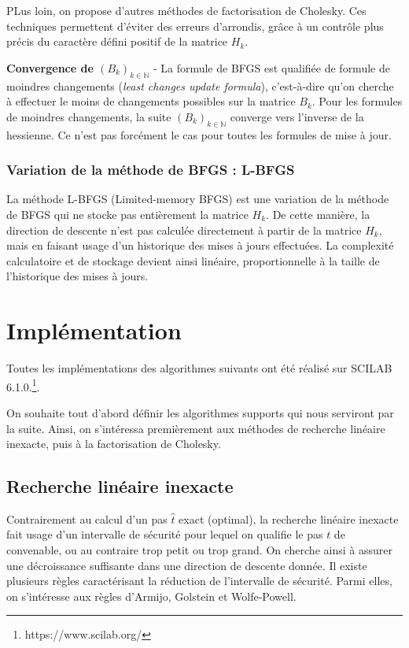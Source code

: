\documentclass[3p, twocolumn]{elsarticle}
\begin{document}
PLus loin, on propose d'autres méthodes de factorisation de Cholesky. Ces techniques permettent d'éviter des erreurs d'arrondis, grâce à un contrôle plus précis du caractère défini positif de la matrice $H_{k}$.

\begin{rmk}
    \textbf{Convergence de $(B_k)_{k\in \mathbb{N}}$} - La formule de BFGS est qualifiée de formule de moindres changements (\textit{least changes update formula}), c'est-à-dire qu'on cherche à effectuer le moins de changements possibles sur la matrice $B_k$. Pour les formules de moindres changements, la suite $(B_k)_{k\in \mathbb{N}}$ converge vers l'inverse de la hessienne. Ce n'est pas forcément le cas pour toutes les formules de mise à jour.
\end{rmk}

\subsubsection{Variation de la méthode de BFGS : L-BFGS}
La méthode L-BFGS (Limited-memory BFGS) est une variation de la méthode de BFGS qui ne stocke pas entièrement la matrice $H_k$. De cette manière, la direction de descente n'est pas calculée directement à partir de la matrice $H_k$, mais en faisant usage d'un historique des mises à jours effectuées. La complexité calculatoire et de stockage devient ainsi linéaire, proportionnelle à la taille de l'historique des mises à jours.

\section{Implémentation}
Toutes les implémentations des algorithmes suivants ont été réalisé sur SCILAB 6.1.0.\footnote{https://www.scilab.org/}.

On souhaite tout d'abord définir les algorithmes supports qui nous serviront par la suite. Ainsi, on s'intéressa premièrement aux méthodes de recherche linéaire inexacte, puis à la factorisation de Cholesky.

\subsection{Recherche linéaire inexacte}
Contrairement au calcul d'un pas $\hat t$ exact (optimal), la recherche linéaire inexacte fait usage d'un intervalle de sécurité pour lequel on qualifie le pas $t$ de convenable, ou au contraire trop petit ou trop grand. On cherche ainsi à assurer une décroissance suffisante dans une direction de descente donnée. Il existe plusieurs règles caractérisant la réduction de l'intervalle de sécurité. Parmi elles, on s'intéresse aux règles d'Armijo, Golstein et Wolfe-Powell.
\end{document}
